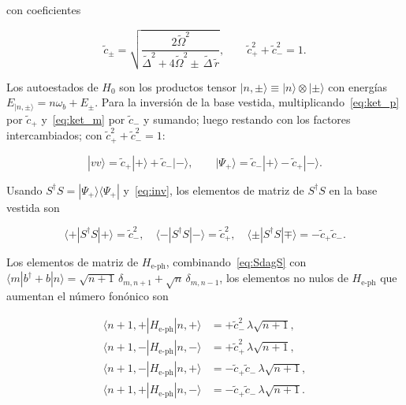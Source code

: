 con coeficientes

\begin{equation}
	\tilde{c}_\pm = \sqrt{\frac{2\widetilde\Omega^2}
		{\widetilde\Delta^2 + 4\widetilde\Omega^2
			\pm\,\widetilde\Delta\,\tilde{r}}},
	\qquad \tilde{c}_+^2 + \tilde{c}_-^2 = 1.
	\label{eq:cpm}
\end{equation}

Los autoestados de $H_0$ son los productos tensor $|n,\pm\rangle \equiv |n\rangle\otimes|\pm\rangle$ con energías $E_{|n,\pm\rangle} = n\omega_b + E_\pm$. Para la inversión de la base vestida, multiplicando~\eqref{eq:ket_p} por $\tilde{c}_+$ y~\eqref{eq:ket_m} por $\tilde{c}_-$ y sumando; luego restando con los factores intercambiados; con $\tilde{c}_+^2+\tilde{c}_-^2 = 1$:

\begin{equation}
	|vv\rangle = \tilde{c}_+|{+}\rangle + \tilde{c}_-|{-}\rangle,
	\qquad
	|\Psi_+\rangle = \tilde{c}_-|{+}\rangle - \tilde{c}_+|{-}\rangle.
	\label{eq:inv}
\end{equation}

Usando $S^\dagger S = |\Psi_+\rangle\langle\Psi_+|$ y~\eqref{eq:inv}, los elementos de matriz de $S^\dagger S$ en la base vestida son

\begin{equation}
	\langle{+}|S^\dagger S|{+}\rangle = \tilde{c}_-^2,\quad
	\langle{-}|S^\dagger S|{-}\rangle = \tilde{c}_+^2,\quad
	\langle{\pm}|S^\dagger S|{\mp}\rangle = -\tilde{c}_+\tilde{c}_-.
	\label{eq:SdagS}
\end{equation}

Los elementos de matriz de $H_\mathrm{e\text{-}ph}$, combinando~\eqref{eq:SdagS} con $\langle m|b^\dagger+b|n\rangle = \sqrt{n+1}\,\delta_{m,n+1}+\sqrt{n}\,\delta_{m,n-1}$, los elementos no nulos de $H_\mathrm{e\text{-}ph}$ que aumentan el número fonónico son

\begin{align}
	\langle n{+}1,{+}|H_\mathrm{e\text{-}ph}|n,{+}\rangle
	&= +\tilde{c}_-^2\,\lambda\sqrt{n+1},
	\label{eq:Heph_pp}\\[4pt]
	\langle n{+}1,{-}|H_\mathrm{e\text{-}ph}|n,{-}\rangle
	&= +\tilde{c}_+^2\,\lambda\sqrt{n+1},
	\label{eq:Heph_mm}\\[4pt]
	\langle n{+}1,{-}|H_\mathrm{e\text{-}ph}|n,{+}\rangle
	&= -\tilde{c}_+\tilde{c}_-\,\lambda\sqrt{n+1},
	\label{eq:Heph_mp}\\[4pt]
	\langle n{+}1,{+}|H_\mathrm{e\text{-}ph}|n,{-}\rangle
	&= -\tilde{c}_+\tilde{c}_-\,\lambda\sqrt{n+1}.
	\label{eq:Heph_pm}
\end{align}


